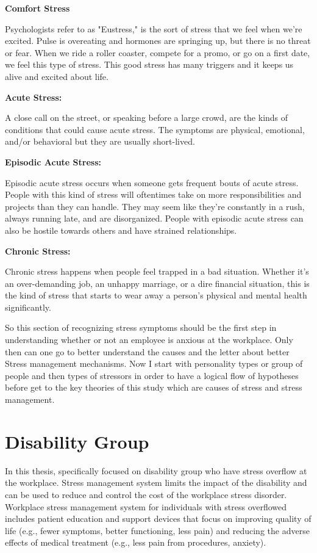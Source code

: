 \textbf{Comfort Stress}

Psychologists refer to as "Eustress," is the sort of stress that we feel when we're excited. Pulse is overeating and hormones are springing up, but there is no threat or fear. When we ride a roller coaster, compete for a promo, or go on a first date, we feel this type of stress. This good stress has many triggers and it keeps us alive and excited about life.

\textbf{Acute Stress: }

A close call on the street, or speaking before a large crowd, are the kinds of conditions that could cause acute stress. The symptoms are physical, emotional, and/or behavioral but they are usually short-lived.

\textbf{Episodic Acute Stress: }

Episodic acute stress occurs when someone gets frequent bouts of acute stress. People with this kind of stress will oftentimes take on more responsibilities and projects than they can handle. They may seem like they’re constantly in a rush, always running late, and are disorganized. People with episodic acute stress can also be hostile towards others and have strained relationships.

\textbf{Chronic Stress: }

Chronic stress happens when people feel trapped in a bad situation. Whether it's an over-demanding job, an unhappy marriage, or a dire financial situation, this is the kind of stress that starts to wear away a person's physical and mental health significantly.\citep{Cottini2013MentalEurope}

So this section of recognizing stress symptoms should be the first step in understanding whether or not an employee is anxious at the workplace.  Only then can one go to better understand the causes and the letter about better Stress management mechanisms. Now I start with personality types or group of people and then types of stressors in order to have a logical flow of hypotheses before get to the key theories of this study which are causes of stress and stress management.

\section{Disability Group}
In this thesis, specifically focused on disability group who have stress overflow at the workplace. Stress management system limits the impact of the disability and can be used to reduce and control the cost of the workplace stress disorder. Workplace stress management system for individuals with stress overflowed includes patient education and support devices that focus on improving quality of life (e.g., fewer symptoms, better functioning, less pain) and reducing the adverse effects of medical treatment (e.g., less pain from procedures, anxiety).\citep{Jones2003StressJapan}
